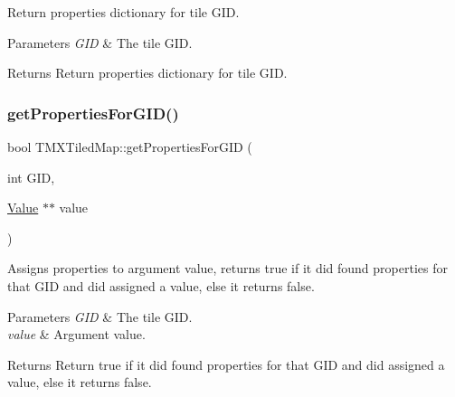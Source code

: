 Return properties dictionary for tile G\+ID.


\begin{DoxyParams}{Parameters}
{\em G\+ID} & The tile G\+ID. \\
\hline
\end{DoxyParams}
\begin{DoxyReturn}{Returns}
Return properties dictionary for tile G\+ID. 
\end{DoxyReturn}
\mbox{\label{classTMXTiledMap_a1f7d99f0a15994f45a04a1607545e76e}} 
\subsubsection{\texorpdfstring{get\+Properties\+For\+G\+I\+D()}{getPropertiesForGID()}\hspace{0.1cm}{\footnotesize\ttfamily [3/4]}}
{\footnotesize\ttfamily bool T\+M\+X\+Tiled\+Map\+::get\+Properties\+For\+G\+ID (\begin{DoxyParamCaption}\item[{int}]{G\+ID,  }\item[{\hyperlink{classValue}{Value} $\ast$$\ast$}]{value }\end{DoxyParamCaption})}

Assigns properties to argument value, returns true if it did found properties for that G\+ID and did assigned a value, else it returns false.


\begin{DoxyParams}{Parameters}
{\em G\+ID} & The tile G\+ID. \\
\hline
{\em value} & Argument value. \\
\hline
\end{DoxyParams}
\begin{DoxyReturn}{Returns}
Return true if it did found properties for that G\+ID and did assigned a value, else it returns false. 
\end{DoxyReturn}
\mbox{\label{classTMXTiledMap_a1f7d99f0a15994f45a04a1607545e76e}} 
